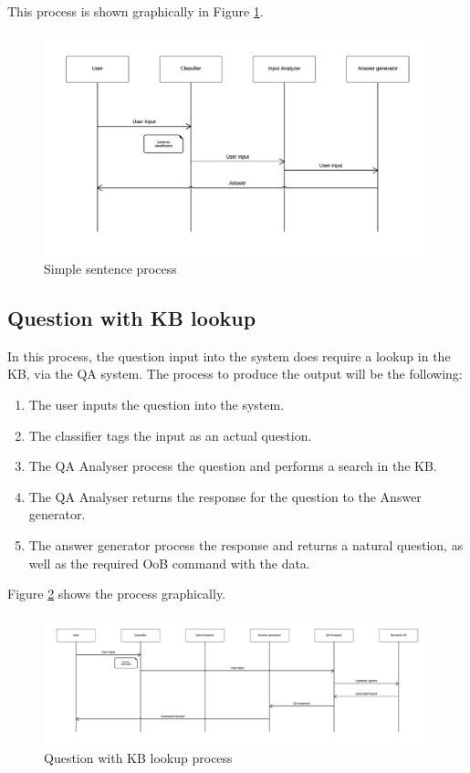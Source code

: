 This process is shown graphically in Figure \ref{fig:arch2}.

\begin{figure}[!htbp]
    \centering
    \includegraphics[width=\textwidth]{img/arch/SimpleSentence.png}
    \caption{Simple sentence process}
    \label{fig:arch2}
\end{figure}

\subsection{Question with \ac{KB} lookup}

In this process, the question input into the system does require a lookup in the \ac{KB}, via the \ac{QA} system. The process to produce the output will be the following:

\begin{enumerate}
 \item The user inputs the question into the system.
 \item The classifier tags the input as an actual question.
 \item The \ac{QA} Analyser process the question and performs a search in the \ac{KB}.
 \item The \ac{QA} Analyser returns the response for the question to the Answer generator.
 \item The answer generator process the response and returns a natural question, as well as the required \ac{OoB} command with the data.
\end{enumerate}

Figure \ref{fig:arch3} shows the process graphically.

\begin{figure}[!htbp]
    \centering
    \includegraphics[width=\textwidth]{img/arch/FullQuestion.png}
    \caption{Question with \ac{KB} lookup process}
    \label{fig:arch3}
\end{figure}

